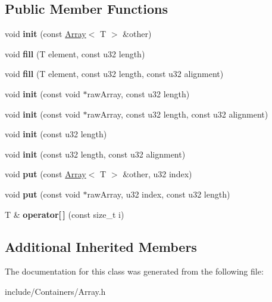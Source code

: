 \subsection*{Public Member Functions}
\begin{DoxyCompactItemize}
\item 
void {\bfseries init} (const \hyperlink{classDE_1_1Array}{Array}$<$ T $>$ \&other)\hypertarget{classDE_1_1Array_a160b6d7bde381664d3a77c7bc72c7126}{}\label{classDE_1_1Array_a160b6d7bde381664d3a77c7bc72c7126}

\item 
void {\bfseries fill} (T element, const u32 length)\hypertarget{classDE_1_1Array_a484d1c75533448adae72bb24b5ca1242}{}\label{classDE_1_1Array_a484d1c75533448adae72bb24b5ca1242}

\item 
void {\bfseries fill} (T element, const u32 length, const u32 alignment)\hypertarget{classDE_1_1Array_a1df5876afd7bea2b6b65e89ae2dbc9f1}{}\label{classDE_1_1Array_a1df5876afd7bea2b6b65e89ae2dbc9f1}

\item 
void {\bfseries init} (const void $\ast$raw\+Array, const u32 length)\hypertarget{classDE_1_1Array_a9399e75853d0c2f946ad23ceeccf6309}{}\label{classDE_1_1Array_a9399e75853d0c2f946ad23ceeccf6309}

\item 
void {\bfseries init} (const void $\ast$raw\+Array, const u32 length, const u32 alignment)\hypertarget{classDE_1_1Array_a424ca2b24f97dd2d0a23626b54405476}{}\label{classDE_1_1Array_a424ca2b24f97dd2d0a23626b54405476}

\item 
void {\bfseries init} (const u32 length)\hypertarget{classDE_1_1Array_aca022d4ff92293f46a634260cb3fd9ed}{}\label{classDE_1_1Array_aca022d4ff92293f46a634260cb3fd9ed}

\item 
void {\bfseries init} (const u32 length, const u32 alignment)\hypertarget{classDE_1_1Array_a5d03e54b2b7cc4b46b1c7c311f1b23c4}{}\label{classDE_1_1Array_a5d03e54b2b7cc4b46b1c7c311f1b23c4}

\item 
void {\bfseries put} (const \hyperlink{classDE_1_1Array}{Array}$<$ T $>$ \&other, u32 index)\hypertarget{classDE_1_1Array_a2b0b137f752a2cf067359581e95bcd46}{}\label{classDE_1_1Array_a2b0b137f752a2cf067359581e95bcd46}

\item 
void {\bfseries put} (const void $\ast$raw\+Array, u32 index, const u32 length)\hypertarget{classDE_1_1Array_a612b948b4b8d915d223a89f4577bcabb}{}\label{classDE_1_1Array_a612b948b4b8d915d223a89f4577bcabb}

\item 
T \& {\bfseries operator\mbox{[}$\,$\mbox{]}} (const size\+\_\+t i)\hypertarget{classDE_1_1Array_a63fea3814adc4a5275b8564a568eddd3}{}\label{classDE_1_1Array_a63fea3814adc4a5275b8564a568eddd3}

\end{DoxyCompactItemize}
\subsection*{Additional Inherited Members}


The documentation for this class was generated from the following file\+:\begin{DoxyCompactItemize}
\item 
include/\+Containers/Array.\+h\end{DoxyCompactItemize}

